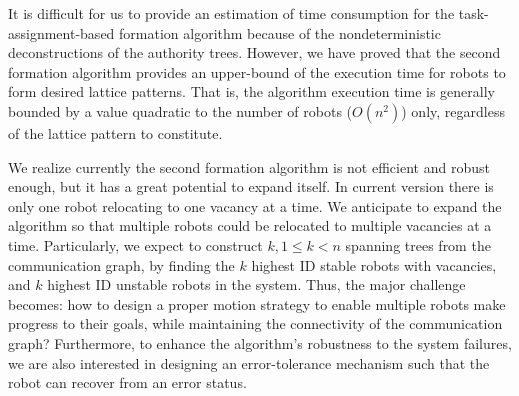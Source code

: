 It is difficult for us to provide an estimation of time consumption for the task-assignment-based formation algorithm because of the nondeterministic deconstructions of the authority trees. 
%
However, we have proved that the second formation algorithm provides an upper-bound of the execution time for robots to form desired lattice patterns.  
%
That is, the algorithm execution time is generally bounded by a value quadratic to the number of robots ($O(n^2)$) only, regardless of the lattice pattern to constitute.


We realize currently the second formation algorithm is not efficient and robust enough,  but it has a great potential to expand itself. 
%
In current version there is only one robot relocating to one vacancy at a time. 
%
We anticipate to expand the algorithm so that multiple robots could be
relocated to multiple vacancies at a time. 
%
Particularly, we expect to construct $k, 1\leq k < n$ spanning trees from the communication graph, by finding the $k$ highest ID stable robots with vacancies,
and $k$ highest ID unstable robots in the system.
Thus, the major challenge becomes: how to design a proper motion strategy to enable multiple robots make progress to their goals, while maintaining the connectivity of the communication graph?
%
Furthermore, to enhance the algorithm's robustness to the system failures, we are also interested in designing an error-tolerance mechanism such that the robot can recover from an error status.